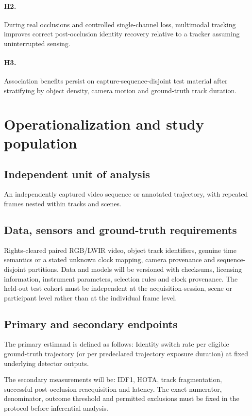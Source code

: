 \documentclass[11pt,a4paper]{article}
\begin{document}
\paragraph{H2.} During real occlusions and controlled single-channel loss, multimodal tracking improves correct post-occlusion identity recovery relative to a tracker assuming uninterrupted sensing.

\paragraph{H3.} Association benefits persist on capture-sequence-disjoint test material after stratifying by object density, camera motion and ground-truth track duration.

\section{Operationalization and study population}
\subsection{Independent unit of analysis}
An independently captured video sequence or annotated trajectory, with repeated frames nested within tracks and scenes.

\subsection{Data, sensors and ground-truth requirements}
Rights-cleared paired RGB/LWIR video, object track identifiers, genuine time semantics or a stated unknown clock mapping, camera provenance and sequence-disjoint partitions. Data and models will be versioned with checksums, licensing information, instrument parameters, selection rules and clock provenance. The held-out test cohort must be independent at the acquisition-session, scene or participant level rather than at the individual frame level.

\subsection{Primary and secondary endpoints}
The primary estimand is defined as follows: Identity switch rate per eligible ground-truth trajectory (or per predeclared trajectory exposure duration) at fixed underlying detector outputs.

The secondary measurements will be: IDF1, HOTA, track fragmentation, successful post-occlusion reacquisition and latency. The exact numerator, denominator, outcome threshold and permitted exclusions must be fixed in the protocol before inferential analysis.
\end{document}
